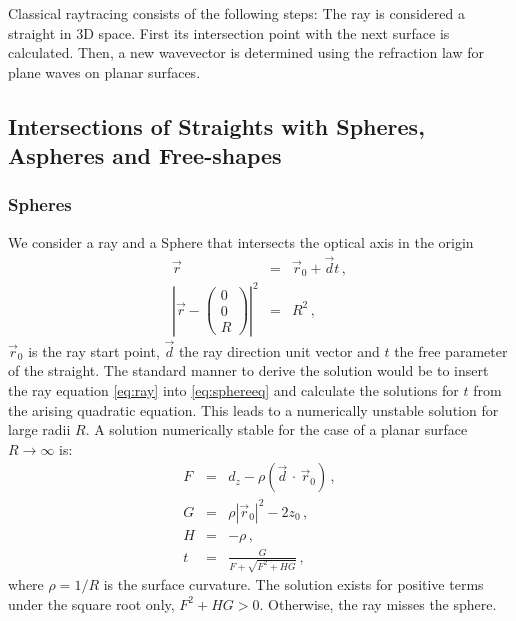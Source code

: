 \documentclass[12pt,a4paper,twoside,openright,BCOR10mm,headsepline,titlepage,abstracton,chapterprefix,final]{scrreprt}
\newcommand\Location{\Vector{r}}
\newcommand\Vector[1]{\vec{#1}}
\newcommand{\scpm}[2]{(#1\,\cdot\,#2)}
\begin{document}
Classical raytracing consists of the following steps: The ray is considered a straight in 3D space. First its intersection point with the next surface is calculated. 
Then, a new wavevector is determined using the refraction law for plane waves on planar surfaces.

\subsection{Intersections of Straights with Spheres, Aspheres and Free-shapes}\label{subsec:intersectionformulas}
\subsubsection{Spheres}
We consider a ray and a Sphere that intersects the optical axis in the origin
\begin{eqnarray}
 \Location &=& \Location_0 + \vec{d} t \label{eq:ray}\,,\\
 \left| \Location - \begin{pmatrix} 0 \\ 0 \\ R \end{pmatrix} \right|^2 &=& R^2\,, \label{eq:sphereeq}
\end{eqnarray}
$\Location_0$ is the ray start point, $\vec{d}$ the ray direction unit vector and $t$ the free parameter of the straight.
The standard manner to derive the solution would be to insert the ray equation \eqref{eq:ray} into
\eqref{eq:sphereeq} and calculate the solutions for $t$ from the arising quadratic equation. This leads to a numerically unstable solution
for large radii $R$.
A solution numerically stable for the case of a planar surface $R \rightarrow \infty$ is:
\begin{subequations}
\label{eq:spheresolution}
\begin{eqnarray}
   F &=& d_z - \rho \scpm{\vec{d}}{\Location_0}\,, \\
   G &=& \rho |\Location_0|^2 - 2 z_0\,, \\
   H &=& - \rho\,, \\
   t &=& \frac{G}{ F + \sqrt{F^2 + H G} }\,, \label{eq:tsolsphere}
\end{eqnarray}
\end{subequations}
where $\rho = 1 / R$ is the surface curvature. 
The solution exists for positive terms under the square root only, $F^2 + H G > 0$. 
Otherwise, the ray misses the sphere.
\end{document}
